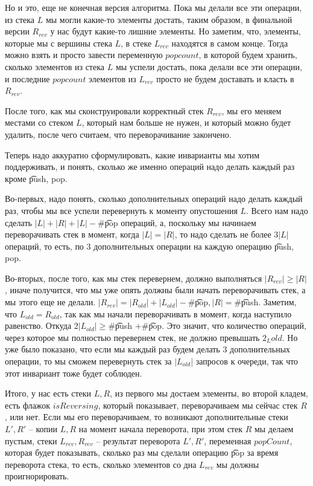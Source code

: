 Но и это, еще не конечная версия алгоритма. Пока мы делали все эти операции, из стека $L$ мы могли какие-то элементы достать,
таким образом, в финальной версии $R_{rev}$ у нас будут какие-то лишние элементы. 
Но заметим, что, элементы, которые мы с вершины стека $L$, в стеке $L_{rev}$ находятся в самом конце.
Тогда можно взять и просто завести переменную $popcount$, в которой будем хранить, сколько элементов из стека $L$ мы успели достать, пока делали
все эти операции, и последние $popcount$ элементов из $L_{rev}$ просто не будем доставать и класть в $R_{rev}$.

После того, как мы сконструировали корректный стек $R_{rev}$, мы его меняем местами со стеком $L$, который нам больше не нужен, и который можно будет
удалить, после чего считаем, что переворачивание закончено.

Теперь надо аккуратно сформулировать, какие инварианты мы хотим поддерживать, и понять, сколько же именно операций надо делать каждый раз кроме
\t{push, pop}.
                
Во-первых, надо понять, сколько дополнительных операций надо делать каждый раз, чтобы мы все успели перевернуть к моменту опустошения $L$.
Всего нам надо сделать $|L| + |R| + |L| - \#$\t{pop} операций, а, поскольку мы начинаем переворачивать стек в момент, когда $|L| = |R|$, то
надо сделать не более $3|L|$ операций, то есть, по 3 дополнительных операции на каждую операцию \t{push, pop}.

Во-вторых, после того, как мы стек перевернем, должно выполняться $|R_{rev}| \ge |R|$, иначе получится, что мы уже опять должны были начать переворачивать
стек, а мы этого еще не делали.
$|R_{rev}| = |R_{old}| + |L_{old}| - \#$\t{pop}$, |R| = \#$\t{push}. 
Заметим, что $L_{old} = R_{old}$, так как мы начали переворачивать в момент, когда наступило равенство.
Откуда $2|L_{old}| \ge \#$\t{push} $+ \#$\t{pop}.
Это значит, что количество операций, через которое мы полностью перевернем стек, не должно превышать $2_L{old}$. 
Но уже было показано, что если мы каждый раз будем делать 3 дополнительных операции, то мы сможем перевернуть
стек за $|L_{old}|$ запросов к очереди, так что этот инвариант тоже будет соблюден.

Итого, у нас есть стеки $L, R$, из первого мы достаем элементы, во второй кладем, есть флажок $isReversing$, который показывает, переворачиваем мы сейчас
стек $R$, или нет.
Если мы его переворачиваем, то возникают дополнительные стеки $L', R'$ -- копии $L, R$ на момент начала переворота, при этом стек $R$ мы делаем пустым,
стеки $L_{rev}, R_{rev}$ -- результат переворота $L', R'$, переменная $popCount$, которая будет показывать, сколько раз мы сделали операцию \t{pop} за время 
переворота стека, то есть, сколько элементов со дна $L_{rev}$ мы должны проигнорировать.

